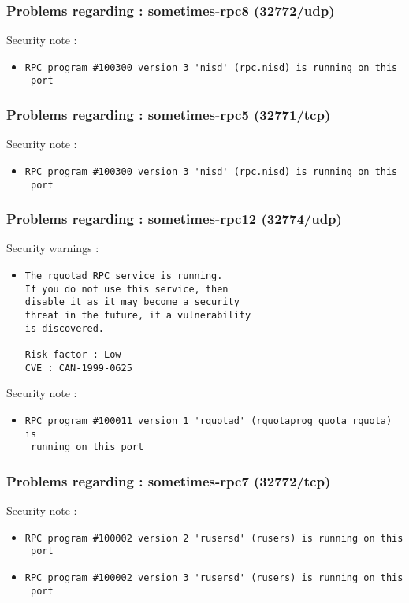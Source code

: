 \documentclass{article}
\begin{document}
\subsubsection{Problems regarding : sometimes-rpc8 (32772/udp)}
Security note :\\
\begin{itemize}
\item \begin{verbatim}
RPC program #100300 version 3 'nisd' (rpc.nisd) is running on this
 port
\end{verbatim}\end{itemize}
\subsubsection{Problems regarding : sometimes-rpc5 (32771/tcp)}
Security note :\\
\begin{itemize}
\item \begin{verbatim}
RPC program #100300 version 3 'nisd' (rpc.nisd) is running on this
 port
\end{verbatim}\end{itemize}
\subsubsection{Problems regarding : sometimes-rpc12 (32774/udp)}
Security warnings :\\
\begin{itemize}
\item \begin{verbatim}
The rquotad RPC service is running. 
If you do not use this service, then
disable it as it may become a security
threat in the future, if a vulnerability
is discovered.

Risk factor : Low
CVE : CAN-1999-0625
\end{verbatim}\end{itemize}
Security note :\\
\begin{itemize}
\item \begin{verbatim}
RPC program #100011 version 1 'rquotad' (rquotaprog quota rquota) is
 running on this port
\end{verbatim}\end{itemize}
\subsubsection{Problems regarding : sometimes-rpc7 (32772/tcp)}
Security note :\\
\begin{itemize}
\item \begin{verbatim}
RPC program #100002 version 2 'rusersd' (rusers) is running on this
 port
\end{verbatim}\item \begin{verbatim}
RPC program #100002 version 3 'rusersd' (rusers) is running on this
 port
\end{verbatim}\end{itemize}
\end{document}
